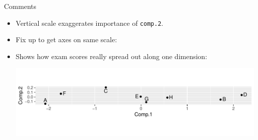 \begin{frame}[fragile]{Comments}
  
  \begin{itemize}
  \item Vertical scale exaggerates importance of \texttt{comp.2}.
    \item Fix up to get axes on same scale:
\begin{knitrout}
\color{fgcolor}\begin{kframe}
\begin{alltt}
\hlkwb{=}\hlstd{(}\hlopt{+}
  \hlstd{()}\hlopt{+}\hlstd{()}\hlopt{+}
  \hlstd{()}
\end{alltt}
\end{kframe}
\end{knitrout}
\item Shows how exam scores really spread out along one dimension:

\begin{knitrout}
\color{fgcolor}\begin{kframe}
\begin{alltt}
\end{alltt}
\end{kframe}
\includegraphics[width=\maxwidth]{figure/eqsc2-1} 

\end{knitrout}
  
  \end{itemize}

\end{frame}


